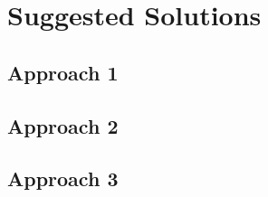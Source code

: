 \chapter{Suggested Solutions}
\label{chapter_solutions}

\section{Approach 1}

\section{Approach 2}

\section{Approach 3}